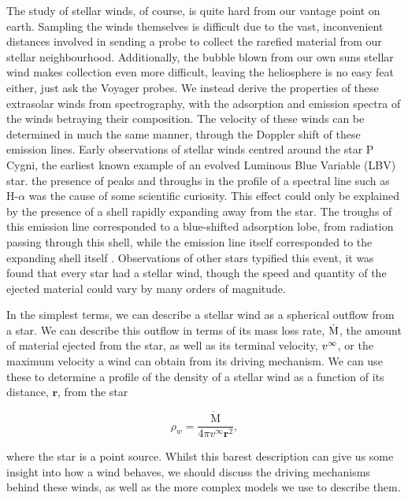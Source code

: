 The study of stellar winds, of course, is quite hard from our vantage point on earth.
Sampling the winds themselves is difficult due to the vast, inconvenient distances involved in sending a probe to collect the rarefied material from our stellar neighbourhood.
Additionally, the bubble blown from our own suns stellar wind makes collection even more difficult, leaving the heliosphere is no easy feat either, just ask the Voyager probes.
We instead derive the properties of these extrasolar winds from spectrography, with the adsorption and emission spectra of the winds betraying their composition.
The velocity of these winds can be determined in much the same manner, through the Doppler shift of these emission lines.
Early observations of stellar winds centred around the star P Cygni, the earliest known example of an evolved Luminous Blue Variable (LBV) star.
the presence of peaks and throughs in the profile of a spectral line such as H-$\alpha$ was the cause of some scientific curiosity.
This effect could only be explained by the presence of a shell rapidly expanding away from the star.
The troughs of this emission line corresponded to a blue-shifted adsorption lobe, from radiation passing through this shell, while the emission line itself corresponded to the expanding shell itself \parencite{bealsNatureWolfRayetEmission1929,lamersIntroductionStellarWinds1999}.
Observations of other stars typified this event, it was found that every star had a stellar wind, though the speed and quantity of the ejected material could vary by many orders of magnitude.

In the simplest terms, we can describe a stellar wind as a spherical outflow from a star.
We can describe this outflow in terms of its mass loss rate, $\dot{\text{M}}$, the amount of material ejected from the star, as well as its terminal velocity, $v^\infty$, or the maximum velocity a wind can obtain from its driving mechanism.
We can use these to determine a profile of the density of a stellar wind as a function of its distance, $\boldsymbol{r}$, from the star

\begin{equation}
  \rho_w = \frac{\dot{\text{M}}}{4 \pi v^\infty \boldsymbol{r}^2}, \label{eq:smoothwind}
\end{equation}

\noindent
where the star is a point source.
Whilst this barest description can give us some insight into how a wind behaves, we should discuss the driving mechanisms behind these winds, as well as the more complex models we use to describe them.

